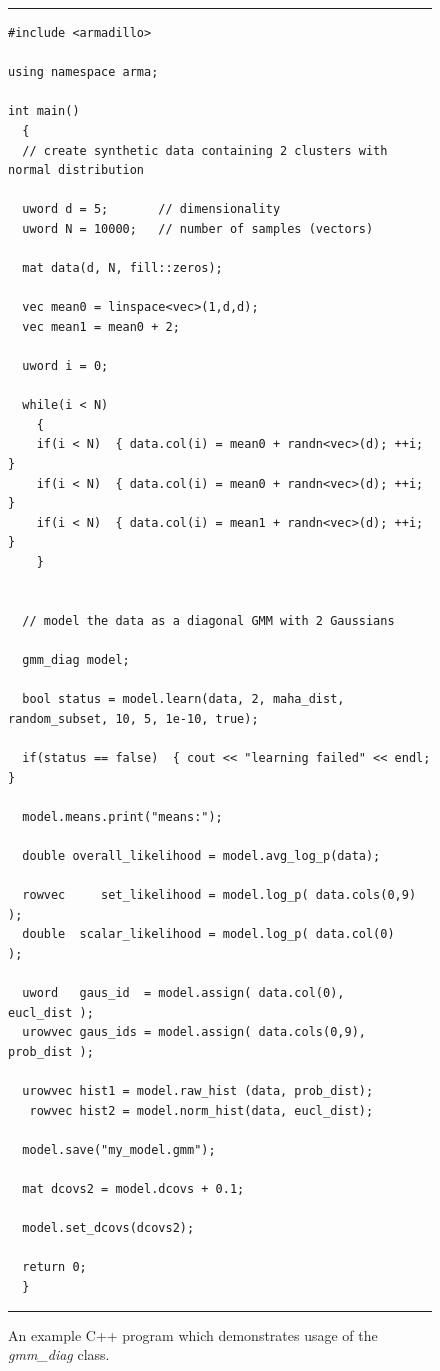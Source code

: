 \begin{figure}[!tb]
\hrule
\vspace{1ex}
\centering
\begin{Verbatim}[fontfamily=fvm,fontsize=\footnotesize]
#include <armadillo>

using namespace arma;

int main()
  {
  // create synthetic data containing 2 clusters with normal distribution
  
  uword d = 5;       // dimensionality
  uword N = 10000;   // number of samples (vectors)
  
  mat data(d, N, fill::zeros);
  
  vec mean0 = linspace<vec>(1,d,d);
  vec mean1 = mean0 + 2;
  
  uword i = 0;
  
  while(i < N)
    {
    if(i < N)  { data.col(i) = mean0 + randn<vec>(d); ++i; }
    if(i < N)  { data.col(i) = mean0 + randn<vec>(d); ++i; }
    if(i < N)  { data.col(i) = mean1 + randn<vec>(d); ++i; }
    }
  
  
  // model the data as a diagonal GMM with 2 Gaussians
  
  gmm_diag model;
  
  bool status = model.learn(data, 2, maha_dist, random_subset, 10, 5, 1e-10, true);
  
  if(status == false)  { cout << "learning failed" << endl; }
  
  model.means.print("means:");
  
  double overall_likelihood = model.avg_log_p(data);
  
  rowvec     set_likelihood = model.log_p( data.cols(0,9) );
  double  scalar_likelihood = model.log_p( data.col(0)    );
  
  uword   gaus_id  = model.assign( data.col(0),    eucl_dist );
  urowvec gaus_ids = model.assign( data.cols(0,9), prob_dist );
  
  urowvec hist1 = model.raw_hist (data, prob_dist);
   rowvec hist2 = model.norm_hist(data, eucl_dist);
  
  model.save("my_model.gmm");
  
  mat dcovs2 = model.dcovs + 0.1;
  
  model.set_dcovs(dcovs2);
  
  return 0;
  }
\end{Verbatim}
\vspace{-1ex}
\hrule
\vspace{0.5ex}
\caption
  {
  An example C++ program which demonstrates usage of the {\it gmm\_diag} class.
  }
\label{fig:example_usage}
\end{figure}


